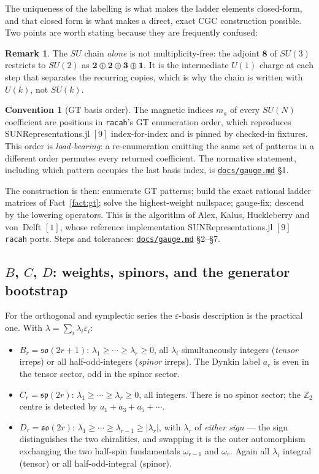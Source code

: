 \documentclass[11pt,a4paper]{article}
\theoremstyle{plain}
\theoremstyle{definition}
\newtheorem{convention}[theorem]{Convention}
\newtheorem{remark}[theorem]{Remark}
\newcommand{\so}{\mathfrak{so}}
\newcommand{\symp}{\mathfrak{sp}}
\newcommand{\ZZ}{\mathbb{Z}}
\newcommand{\code}[1]{\texttt{#1}}
\newcommand{\gaugemd}{\href{https://github.com/Ryo-wtnb11/racah/blob/main/docs/gauge.md}{\code{docs/gauge.md}}}
\begin{document}
The uniqueness of the labelling is what makes the ladder elements closed-form,
and that closed form is what makes a direct, exact CGC construction possible.
Two points are worth stating because they are frequently confused:

\begin{remark}
The $SU$ chain \emph{alone} is not multiplicity-free: the adjoint $\mathbf{8}$
of $SU(3)$ restricts to $SU(2)$ as
$\mathbf{2}\oplus\mathbf{2}\oplus\mathbf{3}\oplus\mathbf{1}$. It is the
intermediate $U(1)$ charge at each step that separates the recurring copies,
which is why the chain is written with $U(k)$, not $SU(k)$.
\end{remark}

\begin{convention}[GT basis order]
The magnetic indices $m_a$ of every $SU(N)$ coefficient are positions in
\code{racah}'s GT enumeration order, which reproduces
SUNRepresentations.jl $[9]$ index-for-index and is pinned by checked-in
fixtures. This order is \emph{load-bearing}: a re-enumeration emitting the same
set of patterns in a different order permutes every returned coefficient. The
normative statement, including which pattern occupies the last basis index, is
\gaugemd{} \S1.
\end{convention}

The construction is then: enumerate GT patterns; build the exact rational
ladder matrices of Fact~\ref{fact:gt}; solve the highest-weight nullspace;
gauge-fix; descend by the lowering operators. This is the algorithm of Alex,
Kalus, Huckleberry and von~Delft $[1]$, whose reference implementation
SUNRepresentations.jl $[9]$ \code{racah} ports. Steps and tolerances:
\gaugemd{} \S2--\S7.

\subsection{$B$, $C$, $D$: weights, spinors, and the generator bootstrap}
\label{sec:bcd}

For the orthogonal and symplectic series the $\varepsilon$-basis description is
the practical one. With $\lambda = \sum_i \lambda_i\varepsilon_i$:

\begin{itemize}[leftmargin=1.4em]
  \item $B_r = \so(2r+1)$: $\lambda_1\ge\cdots\ge\lambda_r\ge 0$, all
    $\lambda_i$ simultaneously integers (\emph{tensor} irreps) or all
    half-odd-integers (\emph{spinor} irreps). The Dynkin label $a_r$ is even in
    the tensor sector, odd in the spinor sector.
  \item $C_r = \symp(2r)$: $\lambda_1\ge\cdots\ge\lambda_r\ge 0$, all integers.
    There is no spinor sector; the $\ZZ_2$ centre is detected by
    $a_1+a_3+a_5+\cdots$.
  \item $D_r = \so(2r)$: $\lambda_1\ge\cdots\ge\lambda_{r-1}\ge|\lambda_r|$,
    with $\lambda_r$ of \emph{either sign} --- the sign distinguishes the two
    chiralities, and swapping it is the outer automorphism exchanging the two
    half-spin fundamentals $\omega_{r-1}$ and $\omega_r$. Again all $\lambda_i$
    integral (tensor) or all half-odd-integral (spinor).
\end{itemize}
\end{document}
